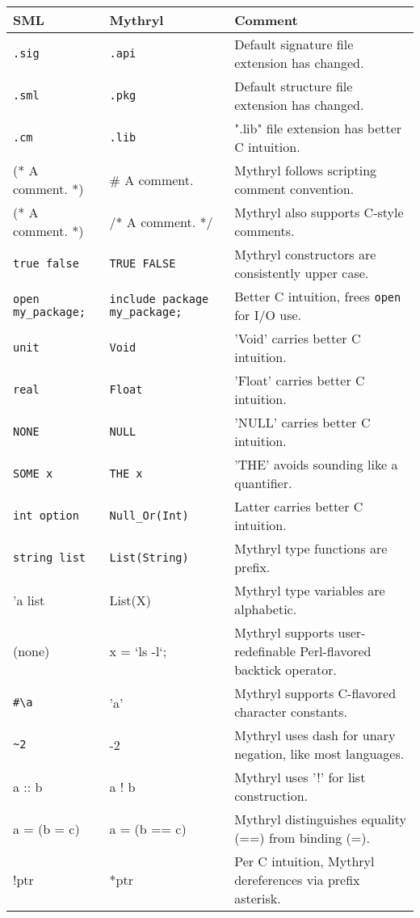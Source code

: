 \begin{tabular}{|l|l|l|} \hline
{\bf SML} & {\bf Mythryl} & {\bf Comment} \\ \hline \hline
{\tt .sig} & {\tt .api} & Default signature file extension has changed. \\ \hline
{\tt .sml} & {\tt .pkg} & Default structure file extension has changed. \\ \hline
{\tt .cm} & {\tt .lib} & ".lib" file extension has better C intuition. \\ \hline
(* A comment. *) & \# A comment. & Mythryl follows scripting comment convention. \\ \hline
(* A comment. *) & /* A comment. */ & Mythryl also supports C-style comments. \\ \hline
{\tt true false} & {\tt TRUE FALSE} & Mythryl constructors are consistently upper case. \\ \hline
{\tt open my\_package;} & {\tt include package my\_package;} & Better C intuition, frees {\tt open} for I/O use. \\ \hline
{\tt unit} & {\tt Void} & 'Void' carries better C intuition. \\ \hline
{\tt real} & {\tt Float} & 'Float' carries better C intuition. \\ \hline
{\tt NONE} & {\tt NULL} & 'NULL' carries better C intuition. \\ \hline
{\tt SOME x} & {\tt THE x} & 'THE' avoids sounding like a quantifier. \\ \hline
{\tt int option} & {\tt Null\_Or(Int)} & Latter carries better C intuition. \\ \hline
{\tt string list} & {\tt List(String)} & Mythryl type functions are prefix. \\ \hline
'a list & List(X) & Mythryl type variables are alphabetic. \\ \hline
(none) & x = `ls -l`; & Mythryl supports user-redefinable Perl-flavored backtick operator. \\ \hline
\verb|#\a| & 'a' & Mythryl supports C-flavored character constants. \\ \hline
\verb|~2| & -2 & Mythryl uses dash for unary negation, like most languages. \\ \hline
a :: b & a ! b & Mythryl uses '!' for list construction. \\ \hline
a = (b = c) & a = (b == c) & Mythryl distinguishes equality (==) from binding (=). \\ \hline
!ptr & *ptr & Per C intuition, Mythryl dereferences via prefix asterisk. \\ \hline

\end{tabular}
